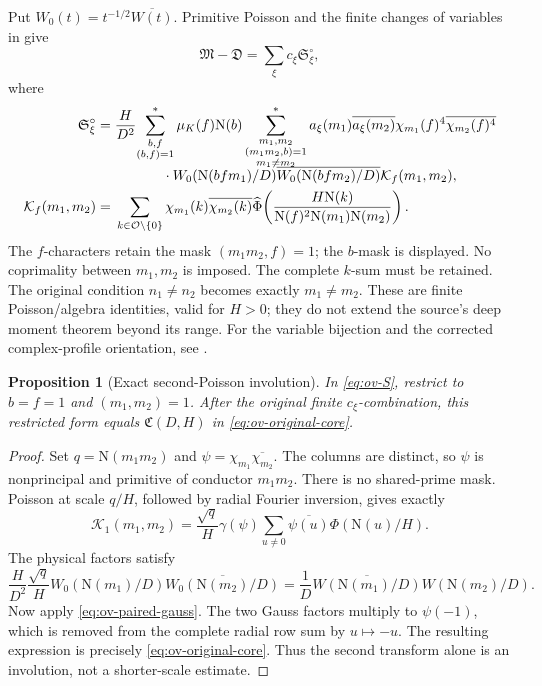 \documentclass[11pt]{article}
\numberwithin{equation}{section}
\newtheorem{proposition}[theorem]{Proposition}
\theoremstyle{definition}
\theoremstyle{remark}
\newcommand{\N}{\mathrm N}
\newcommand{\OO}{\mathcal O}
\newcommand{\muK}{\mu_K}
\newcommand{\Mfrak}{\mathfrak M}
\begin{document}
Put \(W_0(t)=t^{-1/2}\overline{W(t)}\). Primitive Poisson and the
finite changes of variables in \cite[Section~4.4]{OA5} give
\begin{equation}\label{eq:ov-transformed}
 \Mfrak-\mathfrak D=\sum_\xi c_\xi\mathfrak S^\circ_\xi,
\end{equation}
where
\begin{align}
 \mathfrak S^\circ_\xi
 ={}&\frac H{D^2}\!
 \sum_{\substack{b,f\\(b,f)=1}}^*\muK(f)\N(b)
 \sum_{\substack{m_1,m_2\\(m_1m_2,b)=1\\m_1\ne m_2}}^*
 a_\xi(m_1)\overline{a_\xi(m_2)}
 \chi_{m_1}(f)^4\overline{\chi_{m_2}(f)^4}
 \notag\\[-2mm]
 &\hspace{12mm}\cdot
 W_0(\N(bfm_1)/D)\overline{W_0(\N(bfm_2)/D)}
                              \mathcal K_f(m_1,m_2),\label{eq:ov-S}\\
 \mathcal K_f(m_1,m_2)
 ={}&\sum_{k\in\OO\setminus\{0\}}
 \chi_{m_1}(k)\overline{\chi_{m_2}(k)}
 \widehat\Phi\!\left(\frac{H\N(k)}
                  {\N(f)^2\N(m_1)\N(m_2)}\right).
 \label{eq:ov-K}
\end{align}
The \(f\)-characters retain the mask \((m_1m_2,f)=1\); the
\(b\)-mask is displayed. No coprimality between \(m_1,m_2\) is
imposed. The complete \(k\)-sum must be retained.
The original condition \(n_1\ne n_2\) becomes exactly \(m_1\ne m_2\).
These are finite Poisson/algebra identities, valid for \(H>0\);
they do not extend the source's deep moment theorem beyond its range.
For the variable bijection and the corrected complex-profile
orientation, see \cite{N2,N3}.

\begin{proposition}[Exact second-Poisson involution]
\label{prop:ov-involution}
In \eqref{eq:ov-S}, restrict to \(b=f=1\) and
\((m_1,m_2)=1\). After the original finite \(c_\xi\)-combination,
this restricted form equals \(\mathfrak C(D,H)\) in
\eqref{eq:ov-original-core}.
\end{proposition}
\begin{proof}
Set \(q=\N(m_1m_2)\) and
\(\psi=\chi_{m_1}\overline{\chi_{m_2}}\). The columns are distinct,
so \(\psi\) is nonprincipal and primitive of conductor \(m_1m_2\).
There is no shared-prime mask. Poisson at scale \(q/H\), followed
by radial Fourier inversion, gives exactly
\[
 \mathcal K_1(m_1,m_2)
 =\frac{\sqrt q}{H}\gamma(\psi)
               \sum_{u\ne0}\overline{\psi(u)}\Phi(\N(u)/H).
\]
The physical factors satisfy
\[
 \frac H{D^2}\frac{\sqrt q}{H}
 W_0(\N(m_1)/D)\overline{W_0(\N(m_2)/D)}
 =\frac1D\overline{W(\N(m_1)/D)}W(\N(m_2)/D).
\]
Now apply \eqref{eq:ov-paired-gauss}. The two Gauss factors multiply
to \(\psi(-1)\), which is removed from the complete radial row sum
by \(u\mapsto-u\). The resulting expression is precisely
\eqref{eq:ov-original-core}. Thus the second transform alone is an
involution, not a shorter-scale estimate.
\end{proof}
\end{document}
